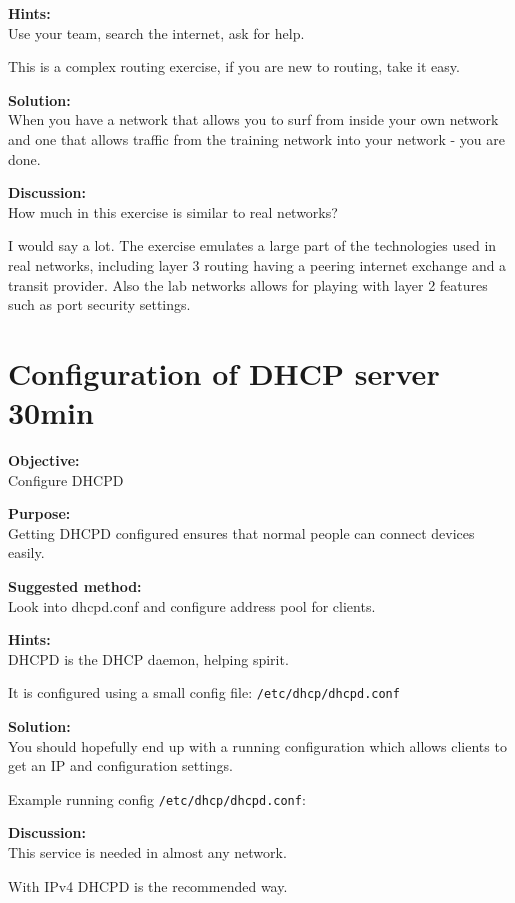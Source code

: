\documentclass[a4paper,11pt,notitlepage]{report}
\begin{document}
{\bf Hints:}\\
Use your team, search the internet, ask for help.

This is a complex routing exercise, if you are new to routing, take it easy.

{\bf Solution:}\\
When you have a network that allows you to surf from inside your own network and one that allows traffic from the training network into your network - you are done.

{\bf Discussion:}\\
How much in this exercise is similar to real networks?

I would say a lot. The exercise emulates a large part of the technologies used in real networks, including layer 3 routing having a peering internet exchange and a transit provider. Also the lab networks allows for playing with layer 2 features such as port security settings.


\chapter{Configuration of DHCP server 30min}
\label{ex:dhcpd-config}

{\bf Objective:}\\
Configure DHCPD

{\bf Purpose:}\\
Getting DHCPD configured ensures that normal people can connect devices easily.

{\bf Suggested method:}\\
Look into dhcpd.conf and configure address pool for clients.

{\bf Hints:}\\
DHCPD is the DHCP daemon, helping spirit.

It is configured using a small config file: \verb+/etc/dhcp/dhcpd.conf+

{\bf Solution:}\\
You should hopefully end up with a running configuration which allows clients to get an IP and configuration settings.

Example running config \verb+/etc/dhcp/dhcpd.conf+:



{\bf Discussion:}\\
This service is needed in almost any network.

With IPv4 DHCPD is the recommended way.
\end{document}
